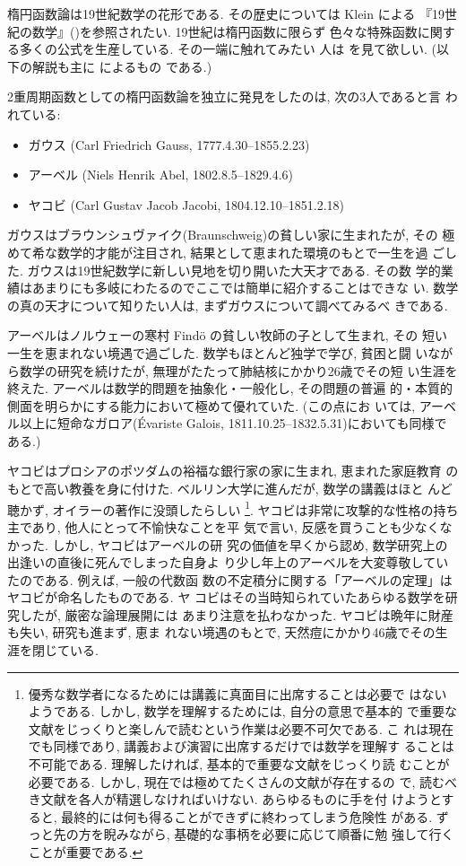 \documentclass[12pt,twoside]{jarticle}
\begin{document}
楕円函数論は19世紀数学の花形である. その歴史については Klein による
『19世紀の数学』(\cite{Klein})を参照されたい. 19世紀は楕円函数に限らず
色々な特殊函数に関する多くの公式を生産している. その一端に触れてみたい
人は \cite{WW} を見て欲しい. (以下の解説も主に \cite{Klein} によるもの
である.)

2重周期函数としての楕円函数論を独立に発見をしたのは, 次の3人であると言
われている:
\begin{itemize}
\item ガウス (Carl Friedrich Gauss, 1777.4.30--1855.2.23)
\item アーベル (Niels Henrik Abel, 1802.8.5--1829.4.6)
\item ヤコビ (Carl Gustav Jacob Jacobi, 1804.12.10--1851.2.18)
\end{itemize}

ガウスはブラウンシュヴァイク(Braunschweig)の貧しい家に生まれたが, その
極めて希な数学的才能が注目され, 結果として恵まれた環境のもとで一生を過
ごした. ガウスは19世紀数学に新しい見地を切り開いた大天才である. その数
学的業績はあまりにも多岐にわたるのでここでは簡単に紹介することはできな
い. 数学の真の天才について知りたい人は, まずガウスについて調べてみるべ
きである.

アーベルはノルウェーの寒村 Find\"o の貧しい牧師の子として生まれ, その
短い一生を恵まれない境遇で過ごした. 数学もほとんど独学で学び, 貧困と闘
いながら数学の研究を続けたが, 無理がたたって肺結核にかかり26歳でその短
い生涯を終えた. アーベルは数学的問題を抽象化・一般化し, その問題の普遍
的・本質的側面を明らかにする能力において極めて優れていた. (この点にお
いては, アーベル以上に短命なガロア(\'Evariste Galois,
1811.10.25--1832.5.31)においても同様である.)

ヤコビはプロシアのポツダムの裕福な銀行家の家に生まれ, 恵まれた家庭教育
のもとで高い教養を身に付けた. ベルリン大学に進んだが, 数学の講義はほと
んど聴かず, オイラーの著作に没頭したらしい%
\footnote{優秀な数学者になるためには講義に真面目に出席することは必要で
  はないようである. しかし, 数学を理解するためには, 自分の意思で基本的
  で重要な文献をじっくりと楽しんで読むという作業は必要不可欠である. こ
  れは現在でも同様であり, 講義および演習に出席するだけでは数学を理解す
  ることは不可能である. 理解したければ, 基本的で重要な文献をじっくり読
  むことが必要である. しかし, 現在では極めてたくさんの文献が存在するの
  で, 読むべき文献を各人が精選しなければいけない. あらゆるものに手を付
  けようとすると, 最終的には何も得ることができずに終わってしまう危険性
  がある. ずっと先の方を睨みながら, 基礎的な事柄を必要に応じて順番に勉
  強して行くことが重要である.}. %
ヤコビは非常に攻撃的な性格の持ち主であり, 他人にとって不愉快なことを平
気で言い, 反感を買うことも少なくなかった. しかし, ヤコビはアーベルの研
究の価値を早くから認め, 数学研究上の出逢いの直後に死んでしまった自身よ
り少し年上のアーベルを大変尊敬していたのである.  例えば, 一般の代数函
数の不定積分に関する「アーベルの定理」はヤコビが命名したものである. ヤ
コビはその当時知られていたあらゆる数学を研究したが, 厳密な論理展開には
あまり注意を払わなかった. ヤコビは晩年に財産も失い, 研究も進まず, 恵ま
れない境遇のもとで, 天然痘にかかり46歳でその生涯を閉じている.
\end{document}
